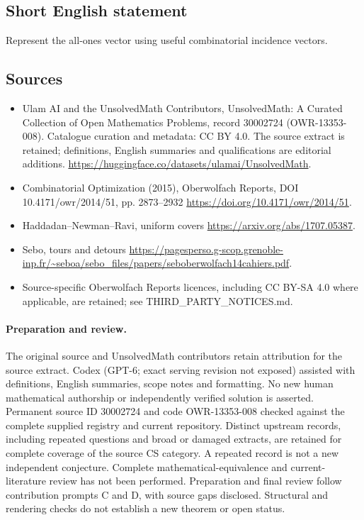 \documentclass[11pt]{article}
\begin{document}
\subsection{Short English statement}
Represent the all-ones vector using useful combinatorial incidence vectors.
\subsection{Sources}
\begin{itemize}
\item[\hypertarget{source:30002724:1}{S1}] Ulam AI and the UnsolvedMath Contributors, UnsolvedMath: A Curated Collection of Open Mathematics Problems, record 30002724 (OWR-13353-008). Catalogue curation and metadata: CC BY 4.0. The source extract is retained; definitions, English summaries and qualifications are editorial additions.
\url{https://huggingface.co/datasets/ulamai/UnsolvedMath}.
\item[\hypertarget{source:30002724:2}{S2}] Combinatorial Optimization (2015), Oberwolfach Reports, DOI 10.4171/owr/2014/51, pp. 2873--2932
\url{https://doi.org/10.4171/owr/2014/51}.
\item[\hypertarget{source:30002724:3}{S3}] Haddadan--Newman--Ravi, uniform covers
\url{https://arxiv.org/abs/1707.05387}.
\item[\hypertarget{source:30002724:4}{S4}] Sebo, tours and detours
\url{https://pagesperso.g-scop.grenoble-inp.fr/~seboa/sebo_files/papers/seboberwolfach14cahiers.pdf}.
\item Source-specific Oberwolfach Reports licences, including CC BY-SA 4.0 where applicable, are retained; see THIRD\_PARTY\_NOTICES.md.
\end{itemize}
\paragraph{Preparation and review.}
The original source and UnsolvedMath contributors retain attribution for the source extract. Codex (GPT-6; exact serving revision not exposed) assisted with definitions, English summaries, scope notes and formatting. No new human mathematical authorship or independently verified solution is asserted. Permanent source ID 30002724 and code OWR-13353-008 checked against the complete supplied registry and current repository. Distinct upstream records, including repeated questions and broad or damaged extracts, are retained for complete coverage of the source CS category. A repeated record is not a new independent conjecture. Complete mathematical-equivalence and current-literature review has not been performed. Preparation and final review follow contribution prompts C and D, with source gaps disclosed. Structural and rendering checks do not establish a new theorem or open status.
\label{end:30002724}
\end{document}

